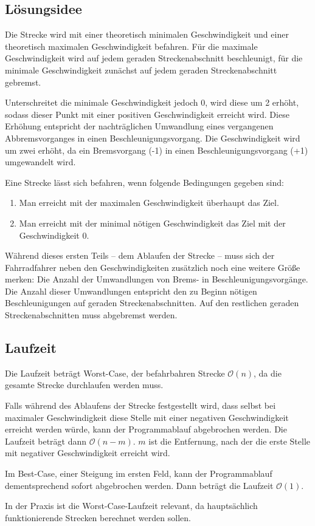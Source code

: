 \subsection {Lösungsidee}
	Die Strecke wird mit einer theoretisch minimalen Geschwindigkeit und einer theoretisch maximalen Geschwindigkeit befahren. 
	Für die maximale Geschwindigkeit wird auf jedem geraden Streckenabschnitt beschleunigt, für die minimale Geschwindigkeit zunächst auf jedem geraden Streckenabschnitt gebremst.

	Unterschreitet die minimale Geschwindigkeit jedoch 0, wird diese um 2 erhöht, sodass dieser Punkt mit einer positiven Geschwindigkeit erreicht wird.
	Diese Erhöhung entspricht der nachträglichen Umwandlung eines vergangenen Abbremsvorganges in einen Beschleunigungsvorgang. Die Geschwindigkeit wird um zwei erhöht, da ein Bremsvorgang (-1) in einen Beschleunigungsvorgang (+1) umgewandelt wird.
	
	Eine Strecke lässt sich befahren, wenn folgende Bedingungen gegeben sind:
	\begin{enumerate}
		\item Man erreicht mit der maximalen Geschwindigkeit überhaupt das Ziel.
		\item Man erreicht mit der minimal nötigen Geschwindigkeit das Ziel mit der Geschwindigkeit 0.
	\end{enumerate}

	Während dieses ersten Teils – dem Ablaufen der Strecke – muss sich der Fahrradfahrer neben den Geschwindigkeiten zusätzlich noch
	eine weitere Größe merken: Die Anzahl der Umwandlungen von Brems- in Beschleunigungsvorgänge. Die Anzahl dieser Umwandlungen entspricht
	den zu Beginn nötigen Beschleunigungen auf geraden Streckenabschnitten. Auf den restlichen geraden Streckenabschnitten muss abgebremst werden.
\subsection{Laufzeit}
	Die Laufzeit beträgt Worst-Case, der befahrbahren Strecke \(\mathcal O(n)\), da die gesamte Strecke durchlaufen werden muss.
	
	Falls während des Ablaufens der Strecke festgestellt wird, dass selbst bei maximaler Geschwindigkeit diese Stelle mit einer negativen Geschwindigkeit erreicht werden würde, kann der Programmablauf abgebrochen werden. Die Laufzeit beträgt dann \(\mathcal O(n-m)\). \(m\) ist die Entfernung, nach der die erste Stelle mit negativer Geschwindigkeit erreicht wird.
	
	Im Best-Case, einer Steigung im ersten Feld, kann der Programmablauf dementsprechend sofort abgebrochen werden. Dann beträgt die Laufzeit \(\mathcal O(1)\).
	
	In der Praxis ist die Worst-Case-Laufzeit relevant, da hauptsächlich funktionierende Strecken berechnet werden sollen. 

